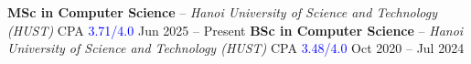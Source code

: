 \vspace{5pt}
\begin{cvhonors}
  \cvhonor
    {\textbf{MSc in Computer Science} -- \emph{Hanoi University of Science and Technology (HUST)} \quad CPA \textcolor{blue}{3.71/4.0}}
    {Jun 2025 -- Present}
  \cvhonor
    {\textbf{BSc in Computer Science} -- \emph{Hanoi University of Science and Technology (HUST)} \quad CPA \textcolor{blue}{3.48/4.0}}
    {Oct 2020 -- Jul 2024}
\end{cvhonors}
\par\vspace{10pt}
